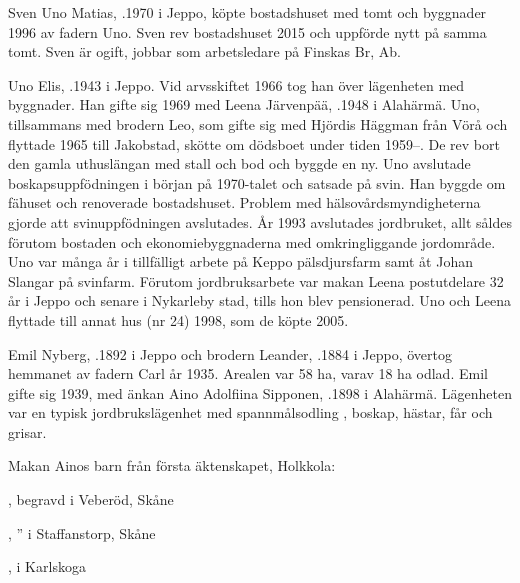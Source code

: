Sven Uno Matias, .1970 i Jeppo, köpte bostadshuset med tomt och byggnader 1996 av fadern Uno. Sven rev bostadshuset 2015 och uppförde nytt på samma tomt. Sven är ogift, jobbar som arbetsledare på Finskas Br, Ab.


Uno Elis, .1943 i Jeppo.  Vid arvsskiftet 1966 tog han över lägenheten med byggnader. Han gifte sig 1969 med Leena Järvenpää, .1948 i Alahärmä.  Uno, tillsammans med brodern Leo, som gifte sig med Hjördis Häggman från Vörå och flyttade 1965 till Jakobstad, skötte om  dödsboet under tiden 1959--. De rev bort den gamla uthuslängan med stall och bod och byggde en ny.  Uno  avslutade boskapsuppfödningen i början på 1970-talet och satsade på svin.  Han byggde om fähuset och renoverade bostadshuset. Problem med hälsovårdsmyndigheterna gjorde att svinuppfödningen avslutades. År 1993 avslutades jordbruket, allt såldes förutom bostaden och ekonomiebyggnaderna med omkringliggande jordområde. Uno var många år i tillfälligt arbete på Keppo pälsdjursfarm samt åt Johan Slangar på svinfarm. Förutom jordbruksarbete var makan Leena postutdelare 32 år i Jeppo och senare i Nykarleby stad, tills hon blev pensionerad. Uno och Leena flyttade till annat hus (nr 24) 1998, som de köpte 2005.
  \begin{jhchildren}
    \item {}
    \item {}
    \item {}
  \end{jhchildren}


Emil Nyberg, .1892 i Jeppo och brodern Leander, .1884 i Jeppo, övertog hemmanet av fadern Carl år 1935. Arealen var 58 ha, varav 18 ha odlad.  Emil gifte sig 1939, med änkan Aino Adolfiina Sipponen, .1898 i Alahärmä. Lägenheten var en typisk jordbrukslägenhet med spannmålsodling , boskap, hästar, får och grisar.
\begin{jhchildren}
  \item {}
  \item {}
\end{jhchildren}
Makan Ainos barn från första äktenskapet, Holkkola:
\begin{jhchildren}
  \item {}, begravd i Veberöd, Skåne
  \item {}, '' i Staffanstorp, Skåne
  \item {}, i Karlskoga
\end{jhchildren}

